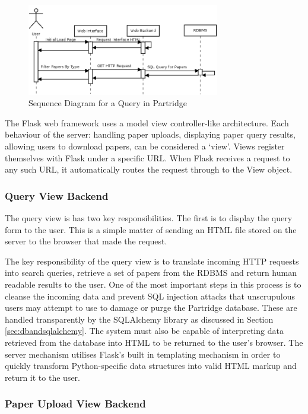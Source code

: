 \begin{figure}[!ht]
\centering
\includegraphics[width=0.75\textwidth]{images/design/backend_sequence.png}
\caption{Sequence Diagram for a Query in Partridge}
\label{fig:backend_sequence}
\end{figure}

The Flask web framework uses a model view controller-like architecture. Each
behaviour of the server: handling paper uploads, displaying paper query
results, allowing users to download papers, can be considered a `view'. Views
register themselves with Flask under a specific URL. When Flask receives a
request to any such URL, it automatically routes the request through to the
View object\cite{flask2012}.

\subsubsection{Query View Backend}
The query view is has two key responsibilities. The first is to display the
query form to the user. This is a simple matter of sending an HTML file stored
on the server to the browser that made the request. 

The key responsibility of the query view is to translate incoming HTTP requests
into search queries, retrieve a set of papers from the RDBMS  and return human
readable results to the user. One of the most important steps in this process
is to cleanse the incoming data and prevent SQL injection attacks that
unscrupulous users may attempt to use to damage or purge the Partridge
database. These are handled transparently by the SQLAlchemy library as
discussed in Section \ref{sec:dbandsqlalchemy}. The system must also be capable
of interpreting data retrieved from the database into HTML to be returned to
the user's browser. The server mechanism utilises Flask's built in templating
mechanism in order to quickly transform Python-specific data structures into
valid HTML markup and return it to the user\cite{flask2012}.

\subsubsection{Paper Upload View Backend}

